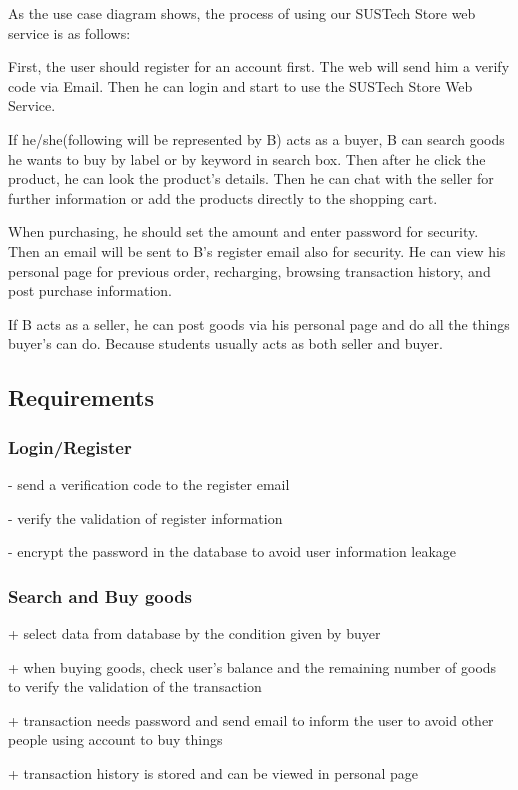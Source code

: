 \documentclass[12pt]{article}  %
\begin{document}
As the use case diagram shows, the process of using our SUSTech 
Store web service is as follows:

First, the user should register for an account first. The web 
will send him a verify code via Email. Then he can login and 
start to use the SUSTech Store Web Service.

If he/she(following will be represented by B) acts as a buyer, 
B can search goods he wants to buy by label or by keyword 
in search box. Then after he click the product, he can look 
the product's details. Then he can chat with the seller for 
further information or add the products directly to the 
shopping cart. 

When purchasing, he should set the amount 
and enter password for security. Then an email will be sent 
to B's register email also for security. He can view his 
personal page for previous order, recharging, browsing 
transaction history, and post purchase information.

If B acts as a seller, he can post goods via his personal 
page and do all the things buyer's can do. Because students 
usually acts as both seller and buyer.




\subsection{Requirements}
\subsubsection*{Login/Register}
- send a verification code to the register email

- verify the validation of register information

- encrypt the password in the database to avoid user 
information leakage

\subsubsection*{Search and Buy goods}
+ select data from database by the condition given 
by buyer

+ when buying goods, check user's balance and the 
remaining number of goods to verify the validation 
of the transaction

+ transaction needs password and send email to inform 
the user to avoid other people using account to buy 
things

+ transaction history is stored and can be viewed 
in personal page
\end{document}
